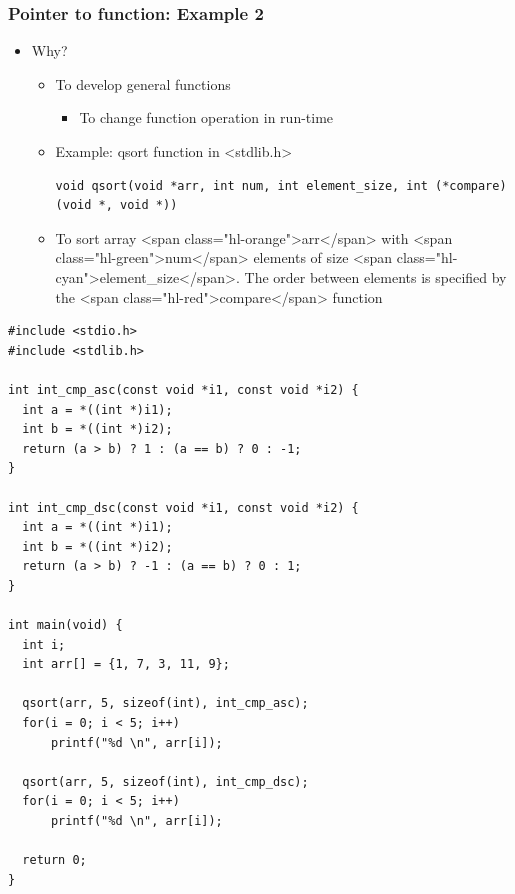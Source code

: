 \documentclass{../c-lecture}
\begin{document}
\begin{frame}[fragile]
  \frametitle{Pointer to function: Example 2}
  \begin{itemize}
    \item Why?
    \begin{itemize}
      \item To develop general functions
      \begin{itemize}
        \item To change function operation in run-time
      \end{itemize}
      \item Example: qsort function in <stdlib.h>
      \begin{verbatim}
void qsort(void *arr, int num, int element_size, int (*compare)(void *, void *))
      \end{verbatim}
      \item
        To sort array <span class="hl-orange">arr</span> with
        <span class="hl-green">num</span> elements of size
        <span class="hl-cyan">element\_size</span>. The order between elements is
        specified by the <span class="hl-red">compare</span> function
    \end{itemize}
  \end{itemize}
\end{frame}

\begin{frame}[fragile]
  \begin{verbatim}
#include <stdio.h>
#include <stdlib.h>

int int_cmp_asc(const void *i1, const void *i2) {
  int a = *((int *)i1);
  int b = *((int *)i2);
  return (a > b) ? 1 : (a == b) ? 0 : -1;
}

int int_cmp_dsc(const void *i1, const void *i2) {
  int a = *((int *)i1);
  int b = *((int *)i2);
  return (a > b) ? -1 : (a == b) ? 0 : 1;
}

int main(void) {
  int i;
  int arr[] = {1, 7, 3, 11, 9};

  qsort(arr, 5, sizeof(int), int_cmp_asc);
  for(i = 0; i < 5; i++)
      printf("%d \n", arr[i]);

  qsort(arr, 5, sizeof(int), int_cmp_dsc);
  for(i = 0; i < 5; i++)
      printf("%d \n", arr[i]);

  return 0;
}
  \end{verbatim}
\end{frame}
\end{document}

